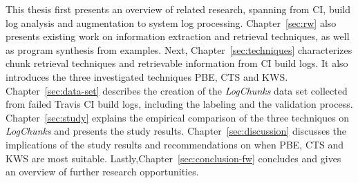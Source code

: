 \documentclass[\myrootdir/main.tex]{subfiles}
\begin{document}
This thesis first presents an overview of related research, spanning from CI, build log analysis and augmentation to system log processing.
Chapter~\ref{sec:rw} also presents existing work on information extraction and retrieval techniques, as well as program synthesis from examples.
Next, Chapter~\ref{sec:techniques} characterizes chunk retrieval techniques and retrievable information from CI build logs.
It also introduces the three investigated techniques PBE, CTS and KWS\@.
Chapter~\ref{sec:data-set} describes the creation of the \emph{LogChunks} data set collected from failed Travis CI build logs, including the labeling and the validation process.
Chapter~\ref{sec:study} explains the empirical comparison of the three techniques on \emph{LogChunks} and presents the study results.
Chapter~\ref{sec:discussion} discusses the implications of the study results and recommendations on when PBE, CTS and KWS are most suitable.
Lastly,Chapter~\ref{sec:conclusion-fw} concludes and gives an overview of further research opportunities.%




\end{document}
